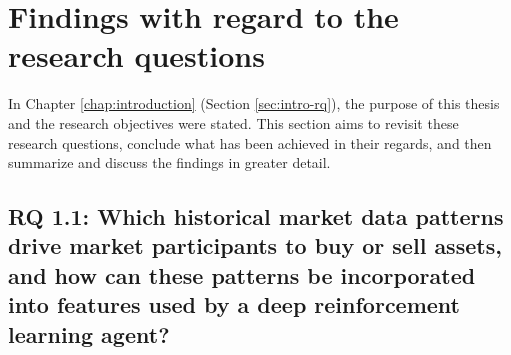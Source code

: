 \section{Findings with regard to the research questions}

In Chapter \ref{chap:introduction} (Section \ref{sec:intro-rq}), the purpose of this thesis and the research objectives were stated.
This section aims to revisit these research questions, conclude what has been achieved in their regards, and then summarize and discuss the findings in greater detail.

\subsection{RQ 1.1: Which historical market data patterns drive market participants to buy or sell assets, and how can these patterns be incorporated into features used by a deep reinforcement learning agent?}

